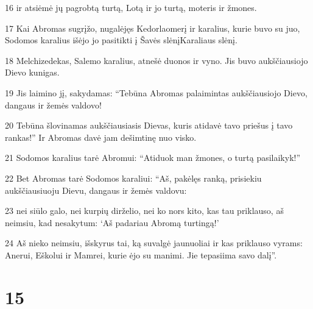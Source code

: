 \par 16 ir atsiėmė jų pagrobtą turtą, Lotą ir jo turtą, moteris ir žmones. 
\par 17 Kai Abromas sugrįžo, nugalėjęs Kedorlaomerį ir karalius, kurie buvo su juo, Sodomos karalius išėjo jo pasitikti į Šavės slėnį­Karaliaus slėnį. 
\par 18 Melchizedekas, Salemo karalius, atnešė duonos ir vyno. Jis buvo aukščiausiojo Dievo kunigas. 
\par 19 Jis laimino jį, sakydamas: “Tebūna Abromas palaimintas aukščiausiojo Dievo, dangaus ir žemės valdovo! 
\par 20 Tebūna šlovinamas aukščiausiasis Dievas, kuris atidavė tavo priešus į tavo rankas!” Ir Abromas davė jam dešimtinę nuo visko. 
\par 21 Sodomos karalius tarė Abromui: “Atiduok man žmones, o turtą pasilaikyk!” 
\par 22 Bet Abromas tarė Sodomos karaliui: “Aš, pakėlęs ranką, prisiekiu aukščiausiuoju Dievu, dangaus ir žemės valdovu: 
\par 23 nei siūlo galo, nei kurpių dirželio, nei ko nors kito, kas tau priklauso, aš neimsiu, kad nesakytum: ‘Aš padariau Abromą turtingą!’ 
\par 24 Aš nieko neimsiu, išskyrus tai, ką suvalgė jaunuoliai ir kas priklauso vyrams: Anerui, Eškolui ir Mamrei, kurie ėjo su manimi. Jie tepasiima savo dalį”.



\chapter{15}



